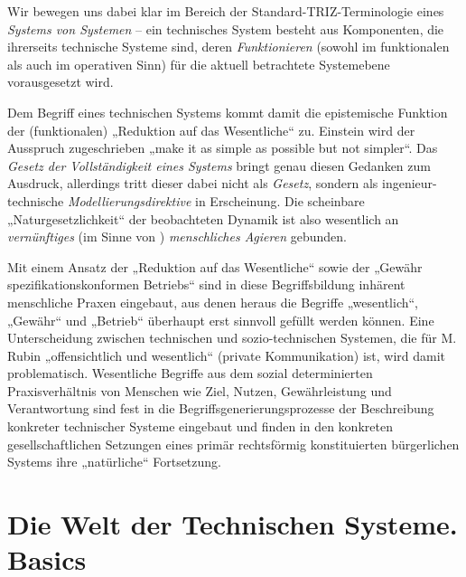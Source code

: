 \documentclass[11pt,a4paper]{article}
\begin{document}
Wir bewegen uns dabei klar im Bereich der Standard-TRIZ-Terminologie eines
\emph{Systems von Systemen} -- ein technisches System besteht aus Komponenten,
die ihrerseits technische Systeme sind, deren \emph{Funktionieren} (sowohl im
funktionalen als auch im operativen Sinn) für die aktuell betrachtete
Systemebene vorausgesetzt wird.

Dem Begriff eines technischen Systems kommt damit die epistemische Funktion
der (funktionalen) „Reduktion auf das Wesentliche“ zu.  Einstein wird der
Ausspruch zugeschrieben „make it as simple as possible but not simpler“. Das
\emph{Gesetz der Vollständigkeit eines Systems} bringt genau diesen Gedanken
zum Ausdruck, allerdings tritt dieser dabei nicht als \emph{Gesetz}, sondern
als ingenieur-technische \emph{Modellierungsdirektive} in Erscheinung.  Die
scheinbare „Naturgesetzlichkeit“ der beobachteten Dynamik ist also wesentlich
an \emph{vernünftiges} (im Sinne von \cite{Vernadsky2001}) \emph{menschliches
  Agieren} gebunden.

Mit einem Ansatz der „Reduktion auf das Wesentliche“ sowie der „Gewähr
spezifikationskonformen Betriebs“ sind in diese Begriffsbildung inhärent
menschliche Praxen eingebaut, aus denen heraus die Begriffe „wesentlich“,
„Gewähr“ und „Betrieb“ überhaupt erst sinnvoll gefüllt werden können.  Eine
Unterscheidung zwischen technischen und sozio-technischen Systemen, die für
M. Rubin „offensichtlich und wesentlich“ (private Kommunikation) ist, wird
damit problematisch. Wesentliche Begriffe aus dem sozial determinierten
Praxisverhältnis von Menschen wie Ziel, Nutzen, Gewährleistung und
Verantwortung sind fest in die Begriffsgenerierungsprozesse der Beschreibung
konkreter technischer Systeme eingebaut und finden in den konkreten
gesellschaftlichen Setzungen eines primär rechtsförmig konstituierten
bürgerlichen Systems ihre „natürliche“ Fortsetzung.

\section{Die Welt der Technischen Systeme. Basics}
\end{document}
